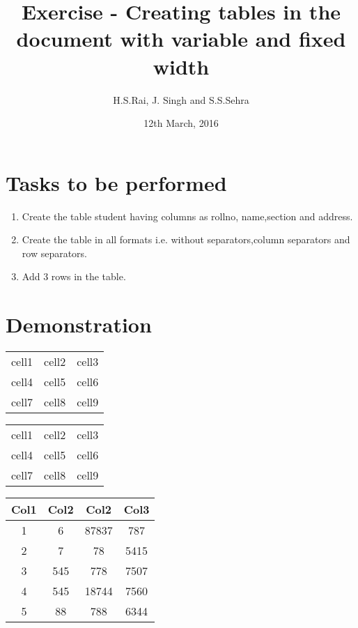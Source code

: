 \documentclass{article}
\title{Exercise  - Creating tables in the document with variable and fixed width}
\author{H.S.Rai, J. Singh and S.S.Sehra}
\date{12th March, 2016}
\begin{document}
	\maketitle	
	\section*{Tasks to be performed}
	\begin{enumerate}	
		\item Create the table student having columns as rollno, name,section and address.
		\item Create the table in all formats i.e. without separators,column separators and row separators.
		\item Add 3 rows in the table.
	\end{enumerate}
	\section*{Demonstration}
\begin{center}
\begin{tabular}{ c c c }
  cell1 & cell2 & cell3 \\ 
  cell4 & cell5 & cell6 \\  
  cell7 & cell8 & cell9    
\end{tabular}
\end{center}
\begin{center}
	\begin{tabular}{ | c | c | c | } 
		\hline
		cell1 & cell2 & cell3 \\ 
		cell4 & cell5 & cell6 \\ 
		cell7 & cell8 & cell9 \\ 
		\hline
	\end{tabular}
\end{center}

\vspace{1cm}

\begin{center}
	\begin{tabular}{||c c c c||} 
		\hline
		Col1 & Col2 & Col2 & Col3 \\ 
		\hline\hline
		1 & 6 & 87837 & 787 \\ 
		\hline
		2 & 7 & 78 & 5415 \\
		\hline
		3 & 545 & 778 & 7507 \\
		\hline
		4 & 545 & 18744 & 7560 \\
		\hline
		5 & 88 & 788 & 6344 \\ 
		\hline
	\end{tabular}
\end{center}
\end{document}
